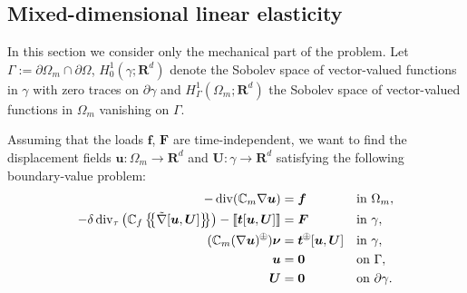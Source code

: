 \documentclass[a4paper]{article}
\def\agrad{\tilde\nabla}
\def\avg#1{\left\{\mskip-5mu\left\{#1\right\}\mskip-5mu\right\}}
\def\div{\operatorname{div}}
\def\FF{\vc F}
\def\ff{\vc f}
\def\jmp#1{\left\llbracket #1 \right\rrbracket}
\def\nnu{\vc\nu}
\def\prtl{\partial}
\def\Real{{\mathbf R}}
\def\tn#1{{\mathbb{#1}}}    %
\def\tt{\vc t}
\def\U{\vc U}
\def\uu{\vc u}
\def\vc#1{\mathbf{\boldsymbol{#1}}}     %
\newcommand{\opm}{ %
  {\mathbin{
    \mathchoice
      {\buildcirclepm{\displaystyle     }{0.14ex}{0.95}{0.05ex}{.7}}
      {\buildcirclepm{\textstyle        }{0.14ex}{0.95}{0.05ex}{.7}}
      {\buildcirclepm{\scriptstyle      }{0.13ex}{0.955}{0.04ex}{.55}}
      {\buildcirclepm{\scriptscriptstyle}{0.08ex}{0.95}{0.03ex}{.45}}
  }} 
}
\newcommand\buildcirclepm[5]{%
  \begin{tikzpicture}[baseline=(X.base), inner sep=-#5, outer sep=-.65]
    \node[draw,circle,line width=#4] (X)  {\footnotesize\raisebox{#2}{\scalebox{#3}{$#1\pm$}}};
  \end{tikzpicture}%
}
\begin{document}
\subsection{Mixed-dimensional linear elasticity}\label{sec:wellposedness_elasticity}

In this section we consider only the mechanical part of the problem.
Let $\Gamma:=\prtl\Omega_m\cap\prtl\Omega$, $H^1_0(\gamma;\Real^d)$ denote the Sobolev space of vector-valued functions in $\gamma$ with zero traces on $\prtl\gamma$ and $H^1_\Gamma(\Omega_m;\Real^d)$ the Sobolev space of vector-valued functions in $\Omega_m$ vanishing on $\Gamma$.

Assuming that the loads $\ff$, $\FF$ are time-independent, we want to find the displacement fields $\uu:\Omega_m\to\Real^d$ and $\U:\gamma\to\Real^d$ satisfying the following boundary-value problem:
\begin{subequations}\label{eq:lin_el_problem}
\begin{align}
-\div(\tn C_m\nabla\uu) &= \ff &&\mbox{in }\Omega_m,\\
-\delta\div_\tau\left(\tn C_f\avg{\agrad[\uu,\U]} \right) - \jmp{\tt[\uu,\U]} &= \FF &&\mbox{in }\gamma,\\
(\tn C_m(\nabla\uu)^\opm)\nnu &= \tt^\opm[\uu,\U] &&\mbox{in }\gamma,\\
\uu &=\vc0&&\mbox{on }\Gamma,\\
\U &=\vc 0&&\mbox{on }\prtl\gamma.
\end{align}
\end{subequations}
\end{document}
